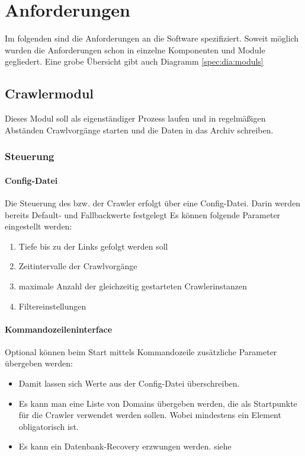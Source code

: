 \chapter{Anforderungen}
Im folgenden sind die Anforderungen an die Software spezifiziert. Soweit möglich wurden
die Anforderungen schon in einzelne Komponenten und Module gegliedert. Eine grobe Übersicht gibt auch Diagramm \ref{spec:dia:moduls}
\section{Crawlermodul}
Dieses Modul soll als eigenständiger Prozess laufen und in regelmäßigen Abständen Crawlvorgänge starten
und die Daten in das Archiv schreiben.

\subsection{Steuerung} \label{spec:req:crawler:control}
	\subsubsection{Config-Datei} \label{spec:req:crawler:control:config} 
		Die Steuerung des bzw. der Crawler erfolgt über eine Config-Datei.
		Darin werden bereits Default- und Fallbackwerte festgelegt  
		Es können folgende Parameter eingestellt werden:
		\begin{enumerate}
			\item Tiefe bis zu der Links gefolgt werden soll
			\item Zeitintervalle der Crawlvorgänge
			\item maximale Anzahl der gleichzeitig gestarteten Crawlerinstanzen
			\item Filtereinstellungen
		\end{enumerate}
	\subsubsection{Kommandozeileninterface} \label{spec:req:crawler:control:cmd} 
		Optional können beim Start mittels Kommandozeile zusätzliche Parameter übergeben werden:
		\begin{itemize}
			\item Damit lassen sich Werte aus der Config-Datei überschreiben.
			\item Es kann man eine Liste von Domains übergeben werden, die als Startpunkte für die Crawler verwendet werden sollen.
				Wobei mindestens ein Element obligatorisch ist.
			\item Es kann ein Datenbank-Recovery erzwungen werden. siehe \label{db:recovery}
		\end{itemize}

